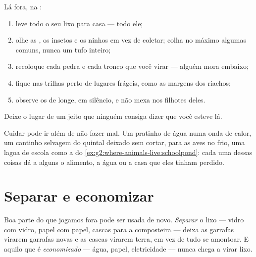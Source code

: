 \begin{method}\label{met:g2:caring-for-nature:rules}
Lá fora, na :
\begin{enumerate}
  \item leve todo o seu lixo para casa --- todo ele;
  \item olhe as , os insetos e os ninhos em vez de coletar;
        colha no máximo algumas  comuns, nunca um tufo
        inteiro;
  \item recoloque cada pedra e cada tronco que você virar ---
        alguém mora embaixo;
  \item fique nas trilhas perto de lugares frágeis, como as margens
        dos riachos;
  \item observe os  de longe, em silêncio, e não mexa nos
        filhotes deles.
\end{enumerate}
Deixe o lugar de um jeito que ninguém consiga dizer que você esteve lá.
\end{method}

\begin{example}\label{ex:g2:caring-for-nature:help}
Cuidar pode ir além de não fazer mal. Um pratinho de água numa onda
de calor, um cantinho selvagem do quintal deixado sem cortar,
 para as aves no frio, uma lagoa de escola como a do
\cref{ex:g2:where-animals-live:schoolpond}: cada uma dessas coisas
dá a alguns  o alimento, a água ou a casa que eles tinham
perdido.
\end{example}

\section{Separar e economizar}

\begin{proposition}\label{prop:g2:caring-for-nature:recycle}
Boa parte do que jogamos fora pode ser usada de novo.
\emph{Separar} o lixo --- vidro com vidro,
papel com papel, cascas para a composteira --- deixa as garrafas
virarem garrafas novas e as cascas virarem terra, em vez de tudo se
amontoar. E aquilo que é \emph{economizado} --- água, papel,
eletricidade --- nunca chega a virar lixo.
\end{proposition}
\admitted

